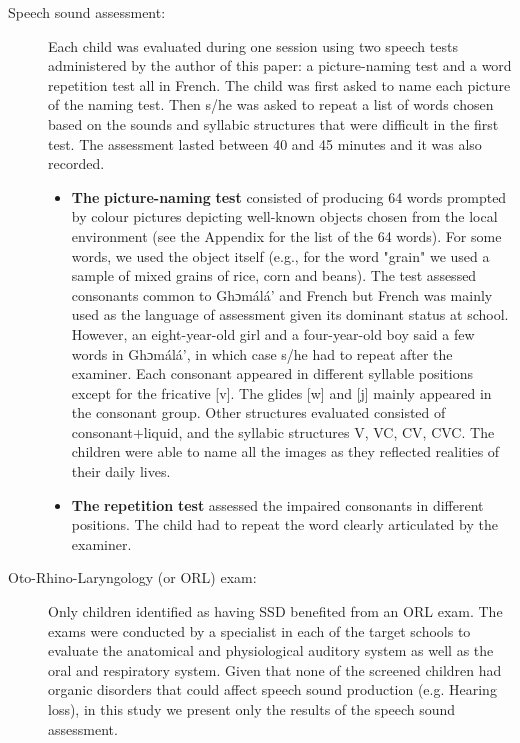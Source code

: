 \documentclass[output=paper,newtxmath,modfonts,nonflat,draftmode]{langsci/langscibook}
\begin{document}
\begin{description}
\item[Speech sound assessment:] {\sloppy Each child was evaluated during one session using two speech tests administered by the author of this paper: a picture-\linebreak naming test and a word repetition test all in French. The child was first asked to name each picture of the naming test. Then s/he was asked to repeat a list of words chosen based on the sounds and syllabic structures that were difficult in the first test. The assessment lasted between 40 and 45 minutes and it was also recorded.}

\begin{itemize}
\item  \textbf{The} \textbf{picture-naming} \textbf{test} consisted of producing 64 words prompted by colour pictures depicting well-known objects chosen from the local environment (see the Appendix for the list of the 64 words). For some words, we used the object itself (e.g., for the word "grain" we used a sample of mixed grains of rice, corn and beans). The test assessed consonants common to Ghɔmálá’ and French but French was mainly used as the language of assessment given its dominant status at school. However, an eight-year-old girl and a four-year-old boy said a few words in Ghɔmálá’, in which case s/he had to repeat after the examiner. Each consonant appeared in different syllable positions except for the fricative [v]. The glides [w] and [j] mainly appeared in the consonant group. Other structures evaluated consisted of consonant+liquid, and the syllabic structures V, VC, CV, CVC. The children were able to name all the images as they reflected realities of their daily lives.
\item  \textbf{The} \textbf{repetition} \textbf{test} assessed the impaired consonants in different positions. The child had to repeat the word clearly articulated by the examiner.
\end{itemize}

\item[Oto-Rhino-Laryngology (or ORL) exam:] Only children identified as having SSD benefited from an ORL exam. The exams were conducted by a specialist in each of the target schools to evaluate the anatomical and physiological auditory system as well as the oral and respiratory system. Given that none of the screened children had organic disorders that could affect speech sound production (e.g. Hearing loss), in this study we present only the results of the speech sound assessment.
\end{description}
\end{document}
